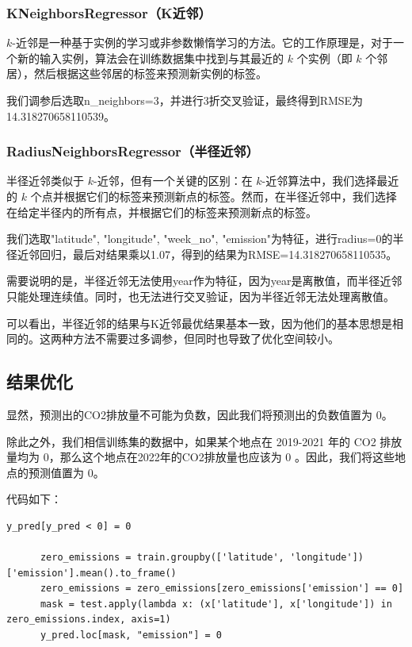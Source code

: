 \documentclass{ctexart}
\begin{document}
\subsubsection{KNeighborsRegressor（K近邻）}

$k$-近邻是一种基于实例的学习或非参数懒惰学习的方法。它的工作原理是，对于一个新的输入实例，算法会在训练数据集中找到与其最近的 $k$ 个实例（即 $k$ 个邻居），然后根据这些邻居的标签来预测新实例的标签。

我们调参后选取n\_neighbors=3，并进行3折交叉验证，最终得到RMSE为14.318270658110539。

\subsubsection{RadiusNeighborsRegressor（半径近邻）}

半径近邻类似于 $k$-近邻，但有一个关键的区别：在 $k$-近邻算法中，我们选择最近的 $k$ 个点并根据它们的标签来预测新点的标签。然而，在半径近邻中，我们选择在给定半径内的所有点，并根据它们的标签来预测新点的标签。

我们选取"latitude", "longitude", "week\_no", "emission"为特征，进行radius=0的半径近邻回归，最后对结果乘以1.07，得到的结果为RMSE=14.318270658110535。

需要说明的是，半径近邻无法使用year作为特征，因为year是离散值，而半径近邻只能处理连续值。同时，也无法进行交叉验证，因为半径近邻无法处理离散值。

可以看出，半径近邻的结果与K近邻最优结果基本一致，因为他们的基本思想是相同的。这两种方法不需要过多调参，但同时也导致了优化空间较小。

\subsection{结果优化}

显然，预测出的CO2排放量不可能为负数，因此我们将预测出的负数值置为 0。

除此之外，我们相信训练集的数据中，如果某个地点在 2019-2021 年的 CO2 排放量均为 0，那么这个地点在2022年的CO2排放量也应该为 0 。因此，我们将这些地点的预测值置为 0。

代码如下：

\begin{lstlisting}[style=Python]
      y_pred[y_pred < 0] = 0
      
      zero_emissions = train.groupby(['latitude', 'longitude'])['emission'].mean().to_frame()
      zero_emissions = zero_emissions[zero_emissions['emission'] == 0]
      mask = test.apply(lambda x: (x['latitude'], x['longitude']) in zero_emissions.index, axis=1)
      y_pred.loc[mask, "emission"] = 0
\end{lstlisting}
\end{document}
